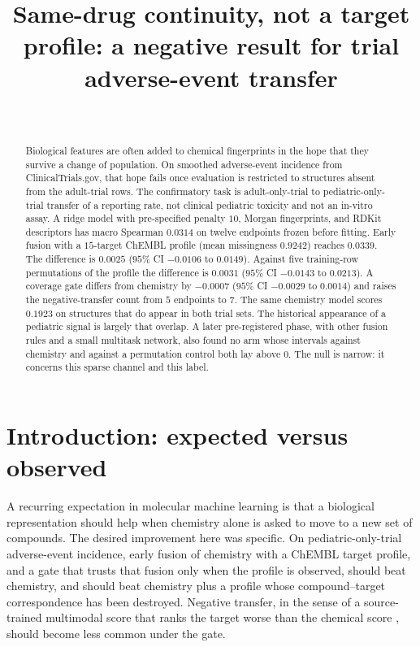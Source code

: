 \documentclass[10pt]{article}
\title{Same-drug continuity, not a target profile: a negative result for trial adverse-event transfer}
\author{\name{Anonymous} \email{anonymous@example.com} \\
\addr{Anonymized for double-blind review}}
\begin{document}
\maketitle

\begin{abstract}
Biological features are often added to chemical fingerprints in the hope that they survive a change of population.
On smoothed adverse-event incidence from ClinicalTrials.gov, that hope fails once evaluation is restricted to structures absent from the adult-trial rows.
The confirmatory task is adult-only-trial to pediatric-only-trial transfer of a reporting rate, not clinical pediatric toxicity and not an in-vitro assay.
A ridge model with pre-specified penalty $10$, Morgan fingerprints, and RDKit descriptors has macro Spearman $0.0314$ on twelve endpoints frozen before fitting.
Early fusion with a $15$-target ChEMBL profile (mean missingness $0.9242$) reaches $0.0339$.
The difference is $0.0025$ ($95\%$ CI $-0.0106$ to $0.0149$).
Against five training-row permutations of the profile the difference is $0.0031$ ($95\%$ CI $-0.0143$ to $0.0213$).
A coverage gate differs from chemistry by $-0.0007$ ($95\%$ CI $-0.0029$ to $0.0014$) and raises the negative-transfer count from $5$ endpoints to $7$.
The same chemistry model scores $0.1923$ on structures that do appear in both trial sets.
The historical appearance of a pediatric signal is largely that overlap.
A later pre-registered phase, with other fusion rules and a small multitask network, also found no arm whose intervals against chemistry and against a permutation control both lay above $0$.
The null is narrow: it concerns this sparse channel and this label.
\end{abstract}

\section{Introduction: expected versus observed}
\label{sec:intro}

A recurring expectation in molecular machine learning is that a biological representation should help when chemistry alone is asked to move to a new set of compounds.
The desired improvement here was specific.
On pediatric-only-trial adverse-event incidence, early fusion of chemistry with a ChEMBL target profile, and a gate that trusts that fusion only when the profile is observed, should beat chemistry, and should beat chemistry plus a profile whose compound--target correspondence has been destroyed.
Negative transfer, in the sense of a source-trained multimodal score that ranks the target worse than the chemical score \citep{zhang2023negativetransfer}, should become less common under the gate.
\end{document}
